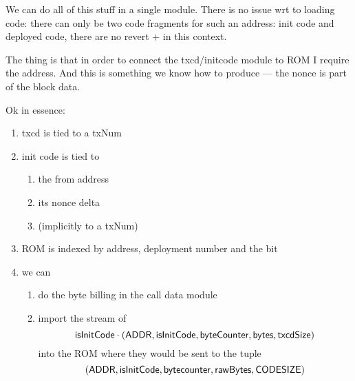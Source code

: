 We can do all of this stuff in a single module. There is no issue wrt to loading code: there can only be two code fragments for such an address: init code and deployed code, there are no revert +  in this context.

The thing is that in order to connect the txcd/initcode module to ROM I require the address. And this is something we know how to produce --- the nonce is part of the block data.

Ok in essence:
\begin{enumerate}
	\item txcd is tied to a txNum
	\item init code is tied to
	\begin{enumerate}
		\item the from address
		\item its nonce delta
		\item (implicitly to a txNum)
	\end{enumerate}
	\item ROM is indexed by address, deployment number and the  bit
	\item we can
	\begin{enumerate}
		\item do the byte billing in the call data module
		\item import the stream of
		\[
			\textsf{isInitCode}
			\cdot
			(\textsf{ADDR}, \textsf{isInitCode}, \textsf{byteCounter}, \textsf{bytes}, \textsf{txcdSize})
		\]
		into the ROM where they would be sent to the tuple
		\[
			(\textsf{ADDR}, \textsf{isInitCode}, \textsf{bytecounter}, \textsf{rawBytes}, \textsf{CODESIZE})
		\]
	\end{enumerate}
\end{enumerate}